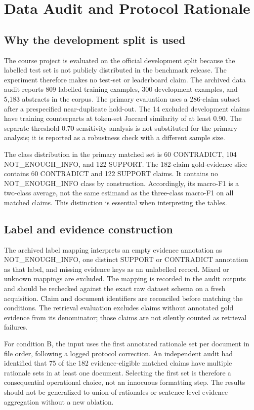 \documentclass[10pt]{article}
\begin{document}
\section{Data Audit and Protocol Rationale}
\subsection{Why the development split is used}
The course project is evaluated on the official development split because the labelled test set is not publicly distributed in the benchmark release. The experiment therefore makes no test-set or leaderboard claim. The archived data audit reports 809 labelled training examples, 300 development examples, and 5,183 abstracts in the corpus. The primary evaluation uses a 286-claim subset after a prespecified near-duplicate hold-out. The 14 excluded development claims have training counterparts at token-set Jaccard similarity of at least 0.90. The separate threshold-0.70 sensitivity analysis is not substituted for the primary analysis; it is reported as a robustness check with a different sample size.

The class distribution in the primary matched set is 60 CONTRADICT, 104 NOT\_ENOUGH\_INFO, and 122 SUPPORT. The 182-claim gold-evidence slice contains 60 CONTRADICT and 122 SUPPORT claims. It contains no NOT\_ENOUGH\_INFO class by construction. Accordingly, its macro-F1 is a two-class average, not the same estimand as the three-class macro-F1 on all matched claims. This distinction is essential when interpreting the tables.

\subsection{Label and evidence construction}
The archived label mapping interprets an empty evidence annotation as NOT\_ENOUGH\_INFO, one distinct SUPPORT or CONTRADICT annotation as that label, and missing evidence keys as an unlabelled record. Mixed or unknown mappings are excluded. The mapping is recorded in the audit outputs and should be rechecked against the exact raw dataset schema on a fresh acquisition. Claim and document identifiers are reconciled before matching the conditions. The retrieval evaluation excludes claims without annotated gold evidence from its denominator; those claims are not silently counted as retrieval failures.

For condition B, the input uses the first annotated rationale set per document in file order, following a logged protocol correction. An independent audit had identified that 75 of the 182 evidence-eligible matched claims have multiple rationale sets in at least one document. Selecting the first set is therefore a consequential operational choice, not an innocuous formatting step. The results should not be generalized to union-of-rationales or sentence-level evidence aggregation without a new ablation.
\end{document}
